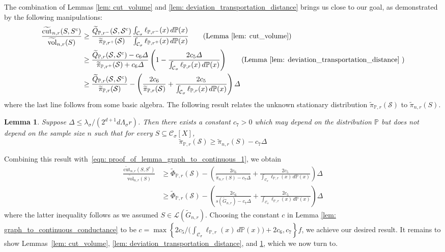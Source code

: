 \documentclass[11pt,twoside]{article}
\newtheorem{lemma}{Lemma}
\newcommand{\set}[1]{\left\{#1\right\}}
\newcommand{\vol}{\mathrm{vol}}
\newcommand{\cut}{\mathrm{cut}}
\newcommand{\1}{\mathbf{1}}
\newcommand{\Xbf}{X}             %
\newcommand{\Pbb}{\mathbb{P}}
\newcommand{\Sset}{\mathcal{S}}
\newcommand{\Cset}{\mathcal{C}}
\newcommand{\Csig}{\Cset_{\sigma}}
\begin{document}
The combination of Lemmas \ref{lem: cut_volume} and \ref{lem: deviation_transportation_distance} brings us close to our goal, as demonstrated by the following manipulations:
\begin{align}
\frac{\widetilde{\cut}_{n,r}(S,S^c)}{\widetilde{\vol}_{n,r}(S)} & \geq \frac{\widetilde{Q}_{\Pbb,r^-}(\Sset,\Sset^c)}{\widetilde{\pi}_{\Pbb,r^+}(\Sset)} \frac{\int_{\Csig} \ell_{\Pbb,r^-}(x) \,d\Pbb(x)}{\int_{\Csig} \ell_{\Pbb,r^+}(x) \,d\Pbb(x)} \tag{Lemma \ref{lem: cut_volume}} \\
& \geq \frac{\widetilde{Q}_{\Pbb,r}(\Sset,\Sset^c) - c_6 \varDelta }{\widetilde{\pi}_{\Pbb,r^+}(\Sset) + c_6 \varDelta} \left(1 - \frac{2 c_5 \varDelta}{\int_{\Csig}\ell_{\Pbb,r}(x)\,d\Pbb(x)}\right) \tag{Lemma \ref{lem: deviation_transportation_distance} } \\
& \geq \frac{\widetilde{Q}_{\Pbb,r}(\Sset,\Sset^c)}{\widetilde{\pi}_{\Pbb,r}(\Sset)} - \left(\frac{2c_6}{\widetilde{\pi}_{\Pbb,r}(\Sset)} + \frac{2c_5}{\int_{\Csig}\ell_{\Pbb,r}(x)\,d\Pbb(x)}\right)\varDelta \label{eqn: proof_of_lemma_graph_to_continuous_1}
\end{align}
where the last line follows from some basic algebra. The following result relates the unknown stationary distribution $\widetilde{\pi}_{\Pbb,r}(\Sset)$ to $\widetilde{\pi}_{n,r}(S)$.
\begin{lemma}
	\label{lem: continuous_pi_lb}
	Suppose $\varDelta \leq \lambda_{\sigma}/(2^{d+1}d\Lambda_{\sigma}r)$. Then there exists a constant $c_7 > 0$ which may depend on the distribution $\Pbb$ but does not depend on the sample size $n$ such that for every $S \subseteq \Csig[\Xbf]$,
	\begin{equation*}
	\widetilde{\pi}_{\Pbb,r}(\Sset) \geq \widetilde{\pi}_{n,r}(S) - c_7 \varDelta
	\end{equation*}
\end{lemma}
Combining this result with~\eqref{eqn: proof_of_lemma_graph_to_continuous_1}, we obtain
\begin{align*}
\frac{\widetilde{\cut}_{n,r}(S,S^c)}{\widetilde{\vol}_{n,r}(S)} & \geq \widetilde{\Phi}_{\Pbb,r}(\Sset) - \left(\frac{2c_6}{\widetilde{\pi}_{n,r}(S) - c_7\varDelta} + \frac{2c_5}{\int_{\Csig}\ell_{\Pbb,r}(x)\,d\Pbb(x)}\right)\varDelta \\
& \geq \widetilde{\Phi}_{\Pbb,r}(\Sset) - \left(\frac{2c_6}{s(\widetilde{G}_{n,r}) - c_7\varDelta} + \frac{2c_5}{\int_{\Csig}\ell_{\Pbb,r}(x)\,d\Pbb(x)}\right)\varDelta
\end{align*}
where the latter inequality follows as we assumed $S \in \mathcal{L}(\widetilde{G}_{n,r})$. Choosing the constant $c$ in Lemma \ref{lem: graph_to_continuous_conductance} to be $c = \max\set{2c_5/\bigl(\int_{\Csig}\ell_{\Pbb,r}(x)\,d\Pbb(x) \bigr) + 2c_6, c_7}f$, we achieve our desired result. It remains to show Lemmas~\ref{lem: cut_volume}, \ref{lem: deviation_transportation_distance}, and \ref{lem: continuous_pi_lb}, which we now turn to.
\end{document}
